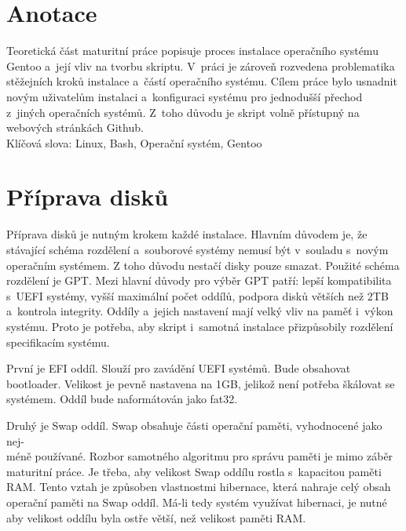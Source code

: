 \documentclass[12pt,a4paper,twoside,]{article}
\begin{document}
\newpage
\renewcommand{\contentsname}{\textsf{Obsah}}\tableofcontents

\newpage
\section{\textsf{Anotace}}
{Teoretická část maturitní práce popisuje proces instalace operačního systému Gentoo
	a~její vliv na tvorbu skriptu. V~práci je zároveň rozvedena problematika stěžejních
	kroků instalace a~částí operačního systému. Cílem práce bylo usnadnit novým uživatelům instalaci a~konfiguraci
	systému pro jednodušší přechod z~jiných operačních systémů. Z~toho důvodu je skript volně přístupný na webových stránkách Github. 
	\vspace{2cm}
	\\Klíčová slova: Linux, Bash, Operační systém, Gentoo
}


\newpage

\section{\textsf{Příprava disků}}
{Příprava disků je nutným krokem každé instalace. Hlavním důvodem je, 
že stávající schéma rozdělení a~souborové systémy nemusí být v~souladu s~novým operačním systémem. 
Z toho důvodu nestačí disky pouze smazat. Použité schéma rozdělení je GPT. 
Mezi hlavní důvody pro výběr GPT patří: lepší kompatibilita s~UEFI systémy, 
vyšší maximální počet oddílů, podpora disků větších než 2TB a~kontrola integrity.
Oddíly a~jejich nastavení mají velký vliv na paměť i~výkon systému. Proto je potřeba, 
aby skript i~samotná instalace přizpůsobily rozdělení specifikacím systému.} 

{První je EFI oddíl. Slouží pro zavádění UEFI systémů. Bude obsahovat bootloader. 
Velikost je pevně nastavena na 1GB, jelikož není potřeba škálovat se systémem.
Oddíl bude naformátován jako fat32.}

{Druhý je Swap oddíl. Swap obsahuje části operační paměti, vyhodnocené jako nej-\\méně používané. 
Rozbor samotného algoritmu pro správu paměti je mimo záběr maturitní práce. Je třeba,
aby velikost Swap oddílu rostla s~kapacitou paměti RAM. Tento vztah je způsoben vlastnostmi hibernace, 
která nahraje celý obsah operační paměti na Swap oddíl. Má-li tedy systém využívat hibernaci, je nutné
aby velikost oddílu byla ostře větší, než velikost paměti RAM. }
\end{document}

